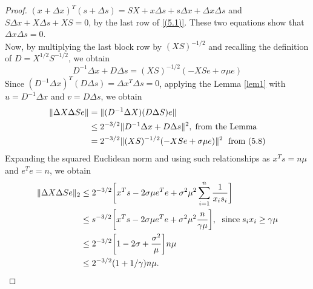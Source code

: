 \documentclass[a4paper,10 pt,titlepage,twoside]{book}
\theoremstyle{plain}
\theoremstyle{definition}
\theoremstyle{remark}
\begin{document}
\begin{proof}
	$(x + \Delta x)^{T}(s +\Delta s) = SX + x \Delta s + s \Delta x + \Delta x \Delta s$ and $S \Delta x + X \Delta s + XS = 0$, by the last row of \ref{(5.1)}. These two equations show that $\Delta x\Delta s = 0$.\\
	Now, by multiplying the last block row by $(XS)^{-1/2}$ and recalling the definition of $D = X^{1/2}S^{-1/2}$, we obtain 
	\begin{equation}
	D^{-1}\Delta x + D \Delta s = (XS)^{-1/2}(-XSe + \sigma \mu e)
	\end{equation}
	Since $(D^{-1}\Delta x)^{T}(D \Delta s) = \Delta x^{T} \Delta{s} = 0$, applying the Lemma \ref{lem1} with $u= D^{-1}\Delta x$ and $v = D \Delta s$, we obtain
	\begin{align*}
		\lVert \Delta X \Delta S e\rVert &= \lVert(D^{-1}\Delta X)(D\Delta S)e \rVert \\
		&\leq 2^{-3/2}\lVert D^{-1}\Delta x + D \Delta s\rVert^{2}, \text{\;from the Lemma}\\
		&= 2^{-3/2}\lVert (XS)^{-1/2}(-XSe + \sigma \mu e)\rVert ^{2} \text{\; from (5.8)}\\
	\end{align*}
	Expanding the squared Euclidean norm and using such relationships as $x^{T}s = n\mu$ and $e^{T}e = n$, we obtain
	\begin{align*}
	\lVert \Delta X \Delta S e\rVert_{2} &\leq 2^{-3/2}\bigg[x^{T}s - 2\sigma \mu e^{T}e + \sigma^{2}\mu^{2}\sum\limits_{i = 1}^{n}\frac{1}{x_{i}s_{i}}\bigg]\\
	 &\leq s^{-3/2}\bigg[x^{T}s - 2\sigma \mu e^{T}e + \sigma^{2}\mu^{2}\frac{n}{\gamma \mu}\bigg], \text{\; since\;} s_{i}x_{i} \geq \gamma \mu\\
	  &\leq 2^{-3/2}\bigg[1 - 2\sigma + \frac{\sigma^{2}}{\mu}\bigg]n \mu\\
	  &\leq 2^{-3/2}(1 + 1/\gamma)n \mu.
	\end{align*}
\end{proof}
\end{document}
